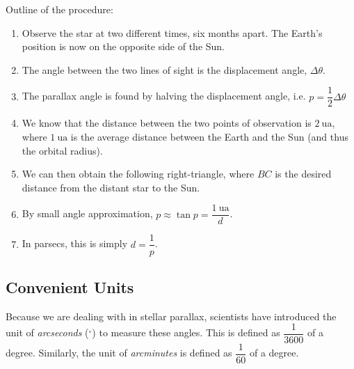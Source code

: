 \documentclass[a4paper,12pt]{article}
\newcommand{\degsym}{^{\circ}}
\begin{document}
Outline of the procedure:
\begin{enumerate}
  \item Observe the star at two different times, six months apart. The Earth's position is now on the opposite side of the Sun.
  \item The angle between the two lines of sight is the displacement angle, $\Delta \theta$.
  \item The parallax angle is found by halving the displacement angle, i.e. $p = \dfrac{1}{2}\Delta \theta$
  \item We know that the distance between the two points of observation is $\SI{2}{\astronomicalunit}$, where $\SI{1}{\astronomicalunit}$ is the average distance between the Earth and the Sun (and thus the orbital radius).
  \item We can then obtain the following right-triangle, where $BC$ is the desired distance from the distant star to the Sun.
        \begin{figure}[H]
          \centering
        \end{figure}
  \item By small angle approximation, $p \approx \tan p = \dfrac{\SI{1}{\astronomicalunit}}{d}$.
  \item In parsecs, this is simply $d = \dfrac{1}{p}$.
\end{enumerate}

\subsection{Convenient Units}

Because we are dealing with  in stellar parallax, scientists have introduced the unit of \textit{arcseconds} ($\degsym$) to measure these angles. This is defined as $\dfrac{1}{3600}$ of a degree. Similarly, the unit of \textit{arcminutes} is defined as $\dfrac{1}{60}$ of a degree.
\end{document}
